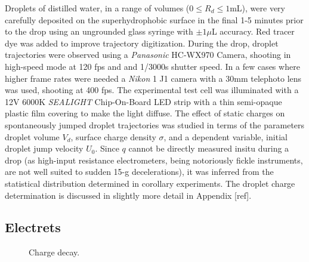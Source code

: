 \documentclass[10pt,a4paper]{article}
\begin{document}
Droplets of distilled water, in a range of volumes ($0 \leq R_d \leq 1$mL), were very carefully deposited on the superhydrophobic surface in the final 1-5 minutes prior to the drop using an ungrounded glass syringe with $\pm 1\mu$L accuracy. Red tracer dye was added to improve trajectory digitization. During the drop, droplet trajectories were observed using a \emph{Panasonic} HC-WX970 Camera, shooting in high-speed mode at 120 fps and and 1/3000s shutter speed. In a few cases where higher frame rates were needed a \emph{Nikon} 1 J1 camera with a 30mm telephoto lens was used, shooting at 400 fps. The experimental test cell was illuminated with a 12V 6000K \emph{SEALIGHT} Chip-On-Board LED strip with a thin semi-opaque plastic film covering to make the light diffuse. The effect of static charges on spontaneously jumped droplet trajectories was studied in terms of the parameters droplet volume $V_d$, surface charge density $\sigma$, and a dependent variable, initial droplet jump velocity $U_0$. Since $q$ cannot be directly measured insitu during a drop (as high-input resistance electrometers, being notoriously fickle instruments, are not well suited to sudden 15-g decelerations), it was inferred from the statistical distribution determined in corollary experiments. The droplet charge determination is discussed in slightly more detail in Appendix  [ref]. 

\subsection{Electrets}

\begin{figure}
    \centering
    
       \caption{Charge decay.\label{fig:hysteresis}}
\end{figure}
\end{document}
